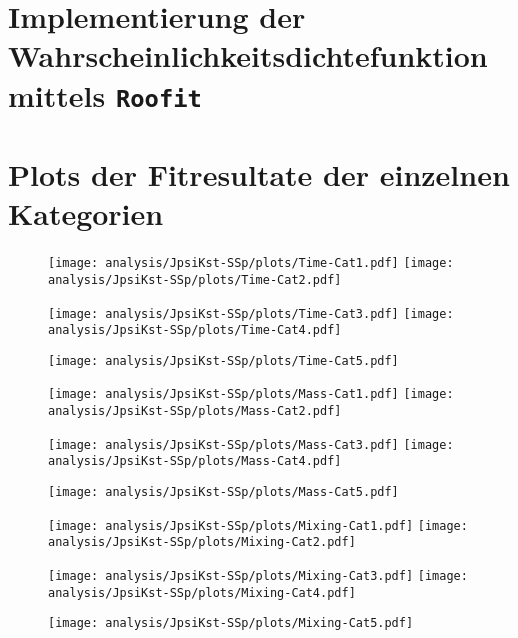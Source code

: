 

\appendix

\section{Implementierung der Wahrscheinlichkeitsdichtefunktion mittels \texttt{Roofit}}




\section{Plots der Fitresultate der einzelnen Kategorien}

\begin{figure}
  \texttt{[image: analysis/JpsiKst-SSp/plots/Time-Cat1.pdf]}
  \texttt{[image: analysis/JpsiKst-SSp/plots/Time-Cat2.pdf]}
\end{figure}
\begin{figure}
  \texttt{[image: analysis/JpsiKst-SSp/plots/Time-Cat3.pdf]}
  \texttt{[image: analysis/JpsiKst-SSp/plots/Time-Cat4.pdf]}
\end{figure}
\begin{figure}
  \centering
  \texttt{[image: analysis/JpsiKst-SSp/plots/Time-Cat5.pdf]}
\end{figure}
\begin{figure}
  \texttt{[image: analysis/JpsiKst-SSp/plots/Mass-Cat1.pdf]}
  \texttt{[image: analysis/JpsiKst-SSp/plots/Mass-Cat2.pdf]}
\end{figure}
\begin{figure}
  \texttt{[image: analysis/JpsiKst-SSp/plots/Mass-Cat3.pdf]}
  \texttt{[image: analysis/JpsiKst-SSp/plots/Mass-Cat4.pdf]}
\end{figure}
\begin{figure}
  \centering
  \texttt{[image: analysis/JpsiKst-SSp/plots/Mass-Cat5.pdf]}
\end{figure}

\begin{figure}
  \texttt{[image: analysis/JpsiKst-SSp/plots/Mixing-Cat1.pdf]}
  \texttt{[image: analysis/JpsiKst-SSp/plots/Mixing-Cat2.pdf]}
\end{figure}
\begin{figure}
  \texttt{[image: analysis/JpsiKst-SSp/plots/Mixing-Cat3.pdf]}
  \texttt{[image: analysis/JpsiKst-SSp/plots/Mixing-Cat4.pdf]}
\end{figure}
\begin{figure}
  \centering
  \texttt{[image: analysis/JpsiKst-SSp/plots/Mixing-Cat5.pdf]}
\end{figure}
